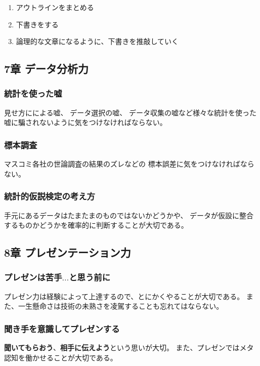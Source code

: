 \documentclass[]{jsarticle}
\begin{document}
            \begin{enumerate}
                \item アウトラインをまとめる
                \item 下書きをする
                \item 論理的な文章になるように、下書きを推敲していく
            \end{enumerate}

    \subsection{7章 データ分析力}
        \subsubsection*{統計を使った嘘}
            見せ方にによる嘘、
            データ選択の嘘、
            データ収集の嘘など様々な統計を使った嘘に騙されないように気をつけなければならない。

        \subsubsection*{標本調査}
            マスコミ各社の世論調査の結果のズレなどの
            標本誤差に気をつけなければならない。

        \subsubsection*{統計的仮説検定の考え方}
            手元にあるデータはたまたまのものではないかどうかや、
            データが仮設に整合するものかどうかを確率的に判断することが大切である。

    \subsection{8章 プレゼンテーション力}
        \subsubsection*{プレゼンは苦手$\dots$と思う前に}
            プレゼン力は経験によって上達するので、とにかくやることが大切である。
            また、一生懸命さは技術の未熟さを凌駕することも忘れてはならない。

        \subsubsection*{聞き手を意識してプレゼンする}
            {\bf 聞いてもらおう}、{\bf 相手に伝えよう}という思いが大切。
            また、プレゼンではメタ認知を働かせることが大切である。
\end{document}
